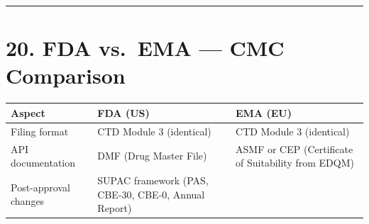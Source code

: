 \documentclass[
  11pt,
  a4paper,
]{report}
\begin{document}
\begin{center}\rule{0.5\linewidth}{0.5pt}\end{center}

\hypertarget{fda-vs.-ema-cmc-comparison}{%
\section{20. FDA vs.~EMA --- CMC
Comparison}\label{fda-vs.-ema-cmc-comparison}}

\begin{longtable}[]{@{}lll@{}}
\toprule
\begin{minipage}[b]{0.26\columnwidth}\raggedright
Aspect\strut
\end{minipage} & \begin{minipage}[b]{0.33\columnwidth}\raggedright
FDA (US)\strut
\end{minipage} & \begin{minipage}[b]{0.33\columnwidth}\raggedright
EMA (EU)\strut
\end{minipage}\tabularnewline
\midrule
\endhead
\begin{minipage}[t]{0.26\columnwidth}\raggedright
Filing format\strut
\end{minipage} & \begin{minipage}[t]{0.33\columnwidth}\raggedright
CTD Module 3 (identical)\strut
\end{minipage} & \begin{minipage}[t]{0.33\columnwidth}\raggedright
CTD Module 3 (identical)\strut
\end{minipage}\tabularnewline
\begin{minipage}[t]{0.26\columnwidth}\raggedright
API documentation\strut
\end{minipage} & \begin{minipage}[t]{0.33\columnwidth}\raggedright
DMF (Drug Master File)\strut
\end{minipage} & \begin{minipage}[t]{0.33\columnwidth}\raggedright
ASMF or CEP (Certificate of Suitability from EDQM)\strut
\end{minipage}\tabularnewline
\begin{minipage}[t]{0.26\columnwidth}\raggedright
Post-approval changes\strut
\end{minipage} & \begin{minipage}[t]{0.33\columnwidth}\raggedright
SUPAC framework (PAS, CBE-30, CBE-0, Annual Report)\strut
\end{minipage} & \begin{minipage}[t]{0.33\columnwidth}\raggedright

\end{minipage}
\end{longtable}
\end{document}
